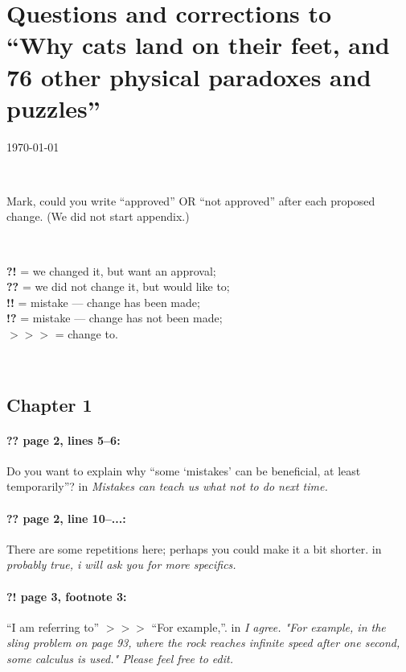 \documentclass[twoside]{article}
\begin{document}
\pagestyle{empty}

\section*{Questions and corrections to\\
``Why cats land on their feet, and 76 other physical paradoxes
and puzzles''}

\today

\

Mark, could you write ``approved'' OR ``not approved'' after each proposed change.
(We did not start appendix.)

\

\noindent
\textbf{?!} = we changed it, but want an approval;\\
\textbf{??} = we did not change it, but would like to;\\
\textbf{!!} = mistake --- change has been made;\\
\textbf{!?} = mistake --- change has not been made;\\
$>\!>\!>$ = change to.

\

\subsection*{Chapter 1}

\paragraph{?? page 2, lines 5--6:} Do you want to explain why “some ‘mistakes’ can be beneficial, at least temporarily”?
 in {\it  Mistakes can teach us what not to do next time. } 

\paragraph{?? page 2, line 10--...:} There are some repetitions here; perhaps you could make it a bit shorter.
 in {\it  probably true, i will ask you for more specifics.} 

\paragraph{?! page 3, footnote 3:} “I am referring to” $>\!>\!>$ “For example,”.
 in {\it I agree. "For example, in the sling problem on page 93, where the rock reaches infinite speed after one second, some calculus is used." Please feel free to edit.} 
\end{document}

